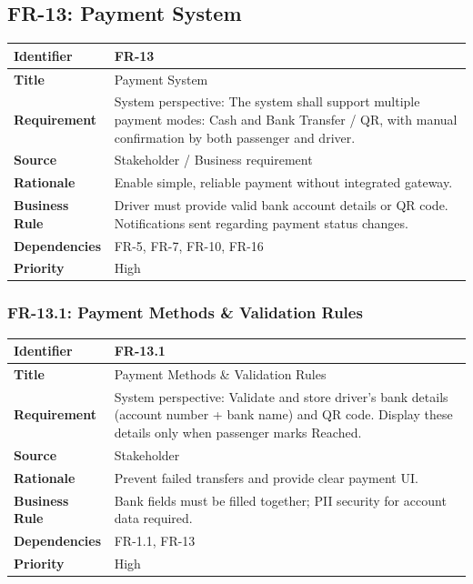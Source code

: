 \subsection{FR-13: Payment System}

\begin{longtable}{|p{3cm}|p{12cm}|}
\hline
\rowcolor{lightgray!30}
\textbf{Identifier} & FR-13 \\
\hline
\textbf{Title} & Payment System \\
\hline
\textbf{Requirement} & System perspective: The system shall support multiple payment modes: Cash and Bank Transfer / QR, with manual confirmation by both passenger and driver. \\
\hline
\textbf{Source} & Stakeholder / Business requirement \\
\hline
\textbf{Rationale} & Enable simple, reliable payment without integrated gateway. \\
\hline
\textbf{Business Rule} & Driver must provide valid bank account details or QR code. Notifications sent regarding payment status changes. \\
\hline
\textbf{Dependencies} & FR-5, FR-7, FR-10, FR-16 \\
\hline
\textbf{Priority} & High \\
\hline
\end{longtable}

\subsubsection{FR-13.1: Payment Methods \& Validation Rules}

\begin{longtable}{|p{3cm}|p{12cm}|}
\hline
\rowcolor{lightgray!30}
\textbf{Identifier} & FR-13.1 \\
\hline
\textbf{Title} & Payment Methods \& Validation Rules \\
\hline
\textbf{Requirement} & System perspective: Validate and store driver’s bank details (account number + bank name) and QR code. Display these details only when passenger marks Reached. \\
\hline
\textbf{Source} & Stakeholder \\
\hline
\textbf{Rationale} & Prevent failed transfers and provide clear payment UI. \\
\hline
\textbf{Business Rule} & Bank fields must be filled together; PII security for account data required. \\
\hline
\textbf{Dependencies} & FR-1.1, FR-13 \\
\hline
\textbf{Priority} & High \\
\hline
\end{longtable}


